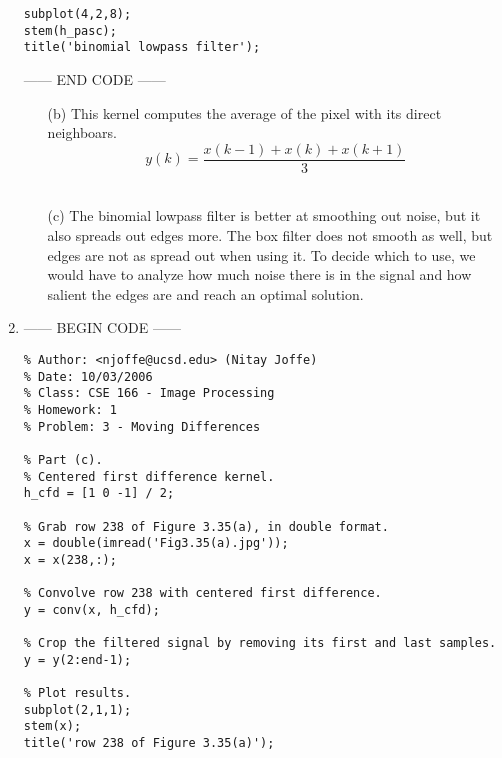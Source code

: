 \documentclass[9pt]{article}
\begin{document}
\begin{enumerate}
\begin{verbatim}
subplot(4,2,8);
stem(h_pasc);
title('binomial lowpass filter'); \end{verbatim}
      ------ END CODE ------ \\
      \begin{enumerate}
        \item[(b)]
          This kernel computes the average of the pixel with its direct
          neighboars. \\
          $$ y(k) = \frac{x(k-1) + x(k) + x(k+1)}{3} $$ \\
        \item[(c)]
          The binomial lowpass filter is better at smoothing out noise, but it
          also spreads out edges more. The box filter does not smooth as well,
          but edges are not as spread out when using it. To decide which to
          use, we would have to analyze how much noise there is in the signal
          and how salient the edges are and reach an optimal solution. \\
      \end{enumerate}
    \item
      ------ BEGIN CODE ------
      \begin{verbatim}
% Author: <njoffe@ucsd.edu> (Nitay Joffe)
% Date: 10/03/2006
% Class: CSE 166 - Image Processing
% Homework: 1
% Problem: 3 - Moving Differences

% Part (c).
% Centered first difference kernel.
h_cfd = [1 0 -1] / 2;

% Grab row 238 of Figure 3.35(a), in double format.
x = double(imread('Fig3.35(a).jpg'));
x = x(238,:);

% Convolve row 238 with centered first difference.
y = conv(x, h_cfd);

% Crop the filtered signal by removing its first and last samples.
y = y(2:end-1);

% Plot results.
subplot(2,1,1);
stem(x);
title('row 238 of Figure 3.35(a)');


\end{verbatim}
\end{enumerate}
\end{document}
